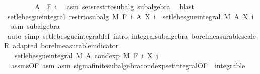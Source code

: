 \begin{isabellebody}
\ \ \ \ \ \ \isamarkupfalse%
\ {\isacharasterisk}{\kern0pt}{\isacharcolon}{\kern0pt}\ {\isachardoublequoteopen}A\ {\isasymin}\ F\ i{\isachardoublequoteclose}\ \isamarkupfalse%
\ asm\ sets{\isacharunderscore}{\kern0pt}restr{\isacharunderscore}{\kern0pt}to{\isacharunderscore}{\kern0pt}subalg\ subalgebra\ \isamarkupfalse%
\ blast\isanewline
\ \ \ \ \ \ \isamarkupfalse%
\ {\isachardoublequoteopen}set{\isacharunderscore}{\kern0pt}lebesgue{\isacharunderscore}{\kern0pt}integral\ {\isacharparenleft}{\kern0pt}restr{\isacharunderscore}{\kern0pt}to{\isacharunderscore}{\kern0pt}subalg\ M\ {\isacharparenleft}{\kern0pt}F\ i{\isacharparenright}{\kern0pt}{\isacharparenright}{\kern0pt}\ A\ {\isacharparenleft}{\kern0pt}X\ i{\isacharparenright}{\kern0pt}\ {\isacharequal}{\kern0pt}\ set{\isacharunderscore}{\kern0pt}lebesgue{\isacharunderscore}{\kern0pt}integral\ M\ A\ {\isacharparenleft}{\kern0pt}X\ i{\isacharparenright}{\kern0pt}{\isachardoublequoteclose}\ \isamarkupfalse%
\ {\isacharasterisk}{\kern0pt}\ asm\ subalgebra\ \isamarkupfalse%
\ {\isacharparenleft}{\kern0pt}auto\ simp{\isacharcolon}{\kern0pt}\ set{\isacharunderscore}{\kern0pt}lebesgue{\isacharunderscore}{\kern0pt}integral{\isacharunderscore}{\kern0pt}def\ intro{\isacharcolon}{\kern0pt}\ integral{\isacharunderscore}{\kern0pt}subalgebra{}\ borel{\isacharunderscore}{\kern0pt}measurable{\isacharunderscore}{\kern0pt}scaleR\ adapted\ borel{\isacharunderscore}{\kern0pt}measurable{\isacharunderscore}{\kern0pt}indicator{\isacharparenright}{\kern0pt}\ \isanewline
\ \ \ \ \ \ \isamarkupfalse%
\ \isamarkupfalse%
\ {\isachardoublequoteopen}{\isachardot}{\kern0pt}{\isachardot}{\kern0pt}{\isachardot}{\kern0pt}\ {\isasymle}\ set{\isacharunderscore}{\kern0pt}lebesgue{\isacharunderscore}{\kern0pt}integral\ M\ A\ {\isacharparenleft}{\kern0pt}cond{\isacharunderscore}{\kern0pt}exp\ M\ {\isacharparenleft}{\kern0pt}F\ i{\isacharparenright}{\kern0pt}\ {\isacharparenleft}{\kern0pt}X\ j{\isacharparenright}{\kern0pt}{\isacharparenright}{\kern0pt}{\isachardoublequoteclose}\ \isamarkupfalse%
\ {\isacharasterisk}{\kern0pt}\ assms{\isacharparenleft}{\kern0pt}{}{\isacharparenright}{\kern0pt}{\isacharbrackleft}{\kern0pt}OF\ asm{\isacharbrackright}{\kern0pt}\ asm\ sigma{\isacharunderscore}{\kern0pt}finite{\isacharunderscore}{\kern0pt}subalgebra{\isachardot}{\kern0pt}cond{\isacharunderscore}{\kern0pt}exp{\isacharunderscore}{\kern0pt}set{\isacharunderscore}{\kern0pt}integral{\isacharbrackleft}{\kern0pt}OF\ {\isacharunderscore}{\kern0pt}\ integrable{\isacharbrackright}{\kern0pt}\ \isamarkupfalse%

\end{isabellebody}
